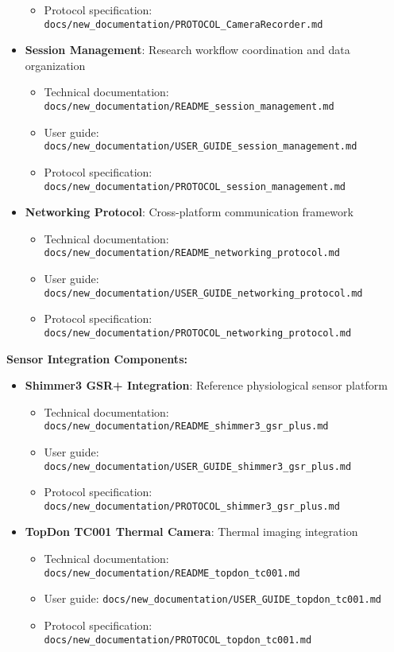 \documentclass[11pt,a4paper]{report}
\begin{document}
\begin{itemize}
\begin{itemize}
      \item Protocol specification: \texttt{docs/new\_documentation/PROTOCOL\_CameraRecorder.md}
    \end{itemize}
  \item \textbf{Session Management}: Research workflow coordination and data organization  
    \begin{itemize}
      \item Technical documentation: \texttt{docs/new\_documentation/README\_session\_management.md}
      \item User guide: \texttt{docs/new\_documentation/USER\_GUIDE\_session\_management.md}
      \item Protocol specification: \texttt{docs/new\_documentation/PROTOCOL\_session\_management.md}
    \end{itemize}
  \item \textbf{Networking Protocol}: Cross-platform communication framework  
    \begin{itemize}
      \item Technical documentation: \texttt{docs/new\_documentation/README\_networking\_protocol.md}
      \item User guide: \texttt{docs/new\_documentation/USER\_GUIDE\_networking\_protocol.md}
      \item Protocol specification: \texttt{docs/new\_documentation/PROTOCOL\_networking\_protocol.md}
    \end{itemize}
\end{itemize}

\textbf{Sensor Integration Components:}
\begin{itemize}
  \item \textbf{Shimmer3 GSR+ Integration}: Reference physiological sensor platform  
    \begin{itemize}
      \item Technical documentation: \texttt{docs/new\_documentation/README\_shimmer3\_gsr\_plus.md}
      \item User guide: \texttt{docs/new\_documentation/USER\_GUIDE\_shimmer3\_gsr\_plus.md}
      \item Protocol specification: \texttt{docs/new\_documentation/PROTOCOL\_shimmer3\_gsr\_plus.md}
    \end{itemize}
  \item \textbf{TopDon TC001 Thermal Camera}: Thermal imaging integration  
    \begin{itemize}
      \item Technical documentation: \texttt{docs/new\_documentation/README\_topdon\_tc001.md}
      \item User guide: \texttt{docs/new\_documentation/USER\_GUIDE\_topdon\_tc001.md}
      \item Protocol specification: \texttt{docs/new\_documentation/PROTOCOL\_topdon\_tc001.md}
    \end{itemize}
\end{itemize}
\end{document}
